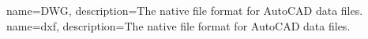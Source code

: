 {
        name=DWG,
        description={The native file format for AutoCAD data files.}
}
{
        name=dxf,
        description={The native file format for AutoCAD data files.}
}